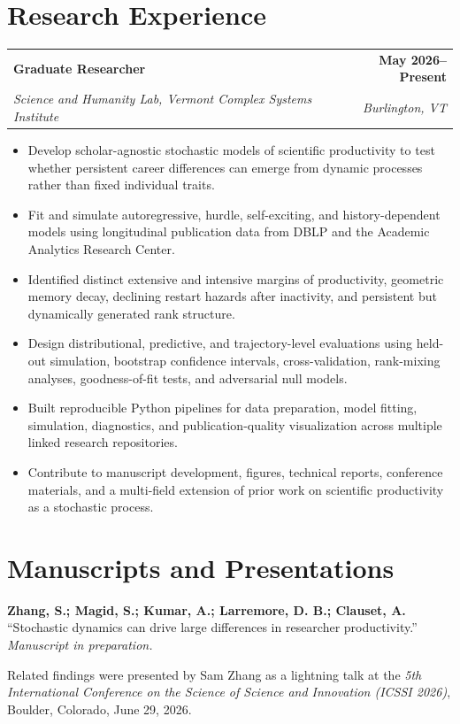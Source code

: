 \documentclass[10pt,letterpaper]{article}
\makeatletter
\newcommand{\entry}[4]{%
  \begin{tabularx}{\textwidth}{@{}Xr@{}}
    \textbf{#1} & \textbf{#2} \\
    \textit{#3} & \textit{#4}
  \end{tabularx}\vspace{-2pt}
}
\makeatother
\begin{document}
\section*{Research Experience}
\entry{Graduate Researcher}{May 2026--Present}{Science and Humanity Lab, Vermont Complex Systems Institute}{Burlington, VT}
\begin{itemize}
  \item Develop scholar-agnostic stochastic models of scientific productivity to test whether persistent career differences can emerge from dynamic processes rather than fixed individual traits.
  \item Fit and simulate autoregressive, hurdle, self-exciting, and history-dependent models using longitudinal publication data from DBLP and the Academic Analytics Research Center.
  \item Identified distinct extensive and intensive margins of productivity, geometric memory decay, declining restart hazards after inactivity, and persistent but dynamically generated rank structure.
  \item Design distributional, predictive, and trajectory-level evaluations using held-out simulation, bootstrap confidence intervals, cross-validation, rank-mixing analyses, goodness-of-fit tests, and adversarial null models.
  \item Built reproducible Python pipelines for data preparation, model fitting, simulation, diagnostics, and publication-quality visualization across multiple linked research repositories.
  \item Contribute to manuscript development, figures, technical reports, conference materials, and a multi-field extension of prior work on scientific productivity as a stochastic process.
\end{itemize}

\section*{Manuscripts and Presentations}
\textbf{Zhang, S.; \textbf{Magid, S.}; Kumar, A.; Larremore, D. B.; Clauset, A.}
``Stochastic dynamics can drive large differences in researcher productivity.'' \textit{Manuscript in preparation.}

\vspace{2pt}
Related findings were presented by Sam Zhang as a lightning talk at the \textit{5th International Conference on the Science of Science and Innovation (ICSSI 2026)}, Boulder, Colorado, June 29, 2026.
\end{document}
